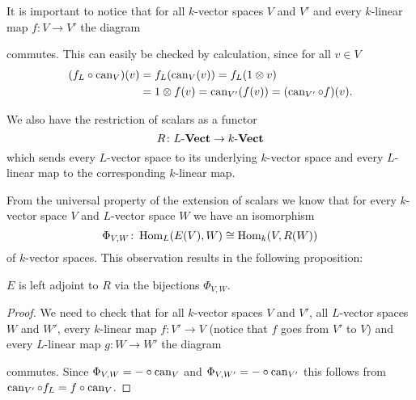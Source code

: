 It is important to notice that for all $k$-vector spaces $V$ and $V'$ and every $k$-linear map $f \colon V \to V'$ the diagram
\begin{center}
\end{center}
commutes. This can easily be checked by calculation, since for all $v \in V$
\begin{align*}
 (f_L \circ \operatorname{can}_V)(v)
 &= f_L(\operatorname{can}_V(v))
 = f_L(1 \otimes v) \\
 &= 1 \otimes f(v)
 = \operatorname{can}_{V'}(f(v))
 = (\operatorname{can}_{V'} \circ f)(v).
\end{align*}





We also have the restriction of scalars as a functor
\[
 R \colon L\text{-}\mathbf{Vect} \to k\text{-}\mathbf{Vect}
\]
which sends every $L$-vector space to its underlying $k$-vector space and every $L$-linear map to the corresponding $k$-linear map.
 
From the universal property of the extension of scalars we know that for every $k$-vector space $V$ and $L$-vector space $W$ we have an isomorphism
\[
 \Phi_{V,W} \colon \operatorname{Hom}_L(E(V),W) \cong \operatorname{Hom}_k(V,R(W))
\]
of $k$-vector spaces. This observation results in the following proposition:
 
 
\begin{prop}
 $E$ is left adjoint to $R$ via the bijections $\Phi_{V,W}$.
\end{prop}
\begin{proof}
 We need to check that for all $k$-vector spaces $V$ and $V'$, all $L$-vector spaces $W$ and $W'$, every $k$-linear map $f \colon V' \to V$ (notice that $f$ goes from $V'$ to $V$) and every $L$-linear map $g \colon W \to W'$ the diagram
 \begin{center}
 \end{center}
 commutes. Since $\Phi_{V,W} = - \circ \operatorname{can}_V$ and $\Phi_{V,W'} = - \circ \operatorname{can}_{V'}$ this follows from $\operatorname{can}_{V'} \circ f_L = f \circ \operatorname{can}_V$.
\end{proof}





